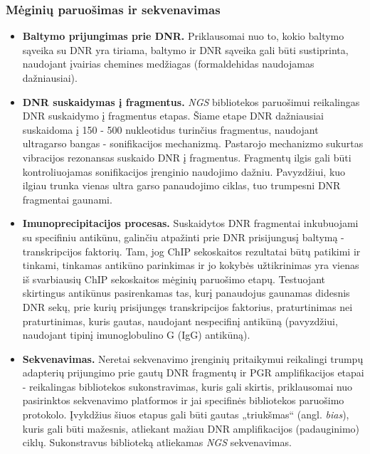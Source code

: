 \documentclass[12pt]{article}
\begin{document}
\subsubsection{Mėginių paruošimas ir sekvenavimas}
\begin{itemize}
    \item \textbf{Baltymo prijungimas prie DNR.} Priklausomai nuo to, kokio
        baltymo sąveika su DNR yra tiriama, baltymo ir DNR sąveika gali būti
        sustiprinta, naudojant įvairias chemines medžiagas (formaldehidas
        naudojamas dažniausiai).
    \item \textbf{DNR suskaidymas į fragmentus.} \emph{NGS} bibliotekos 
        paruošimui reikalingas DNR suskaidymo į fragmentus etapas. Šiame etape
        DNR dažniausiai suskaidoma į 150 - 500 nukleotidus turinčius fragmentus,
        naudojant ultragarso bangas - sonifikacijos mechanizmą. Pastarojo
        mechanizmo sukurtas vibracijos rezonansas suskaido DNR į fragmentus.
        Fragmentų ilgis gali būti kontroliuojamas sonifikacijos įrenginio
        naudojimo dažniu. Pavyzdžiui, kuo ilgiau trunka vienas ultra garso
        panaudojimo ciklas, tuo trumpesni DNR fragmentai
        gaunami\cite{SONICATION}.
    \item \textbf{Imunoprecipitacijos procesas.} Suskaidytos DNR fragmentai
        inkubuojami su specifiniu antikūnu, galinčiu atpažinti prie DNR
        prisijungusį baltymą - transkripcijos faktorių. Tam, jog ChIP
        sekoskaitos rezultatai būtų patikimi ir tinkami, tinkamas antikūno
        parinkimas ir jo kokybės užtikrinimas yra vienas iš svarbiausių ChIP
        sekoskaitos mėginių paruošimo etapų\cite{ARTICLE3}. Testuojant
        skirtingus antikūnus pasirenkamas tas, kurį panaudojus gaunamas
        didesnis DNR sekų, prie kurių prisijungęs transkripcijos faktorius,
        praturtinimas nei praturtinimas, kuris gautas, naudojant nespecifinį
        antikūną\cite{ARTICLE4} (pavyzdžiui, naudojant tipinį imunoglobulino G
        (IgG) antikūną).
    \item \textbf{Sekvenavimas.} Neretai sekvenavimo įrenginių pritaikymui
        reikalingi trumpų adapterių prijungimo prie gautų DNR fragmentų ir PGR
        amplifikacijos etapai - reikalingas bibliotekos sukonstravimas, kuris
        gali skirtis, priklausomai nuo pasirinktos sekvenavimo platformos
        ir jai specifinės bibliotekos paruošimo protokolo\cite{ARTICLE5}.
        Įvykdžius šiuos etapus gali būti gautas „triukšmas“\cite{ARTICLE4}
        (angl. \emph{bias}), kuris gali būti mažesnis, atliekant mažiau DNR
        amplifikacijos (padauginimo) ciklų. Sukonstravus biblioteką atliekamas
        \emph{NGS} sekvenavimas.
        
\end{itemize}
\end{document}

